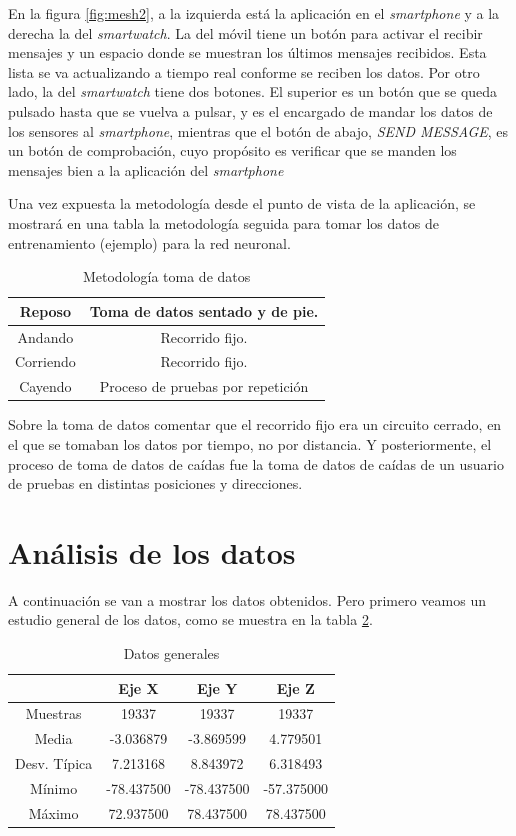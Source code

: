 \documentclass[12pt]{book}
\numberwithin{equation}{section}
\begin{document}
En la figura \ref{fig:mesh2}, a la izquierda está la aplicación en el \textit{smartphone} y a la derecha la del \textit{smartwatch}. La del móvil tiene un botón para activar el recibir mensajes y un espacio donde se muestran los últimos mensajes recibidos. Esta lista se va actualizando a tiempo real conforme se reciben los datos. Por otro lado, la del \textit{smartwatch} tiene dos botones. El superior es un botón que se queda pulsado hasta que se vuelva a pulsar, y es el encargado de mandar los datos de los sensores al \textit{smartphone}, mientras que el botón de abajo, \textit{SEND MESSAGE}, es un botón de comprobación, cuyo propósito es verificar que se manden los mensajes bien a la aplicación del \textit{smartphone}

Una vez expuesta la metodología desde el punto de vista de la aplicación, se mostrará en una tabla la metodología seguida para tomar los datos de entrenamiento (ejemplo) para la red neuronal.

\begin{table}
\centering
\caption{Metodología toma de datos}
\begin{tabular}{| c | c |}
\hline
Reposo & Toma de datos sentado y de pie. \\
\hline
Andando & Recorrido fijo. \\
\hline
Corriendo & Recorrido fijo. \\
\hline
Cayendo & Proceso de pruebas por repetición \\
\hline
\end{tabular}
\label{tabla1}
\end{table}

Sobre la toma de datos comentar que el recorrido fijo era un circuito cerrado, en el que se tomaban los datos por tiempo, no por distancia. Y posteriormente, el proceso de toma de datos de caídas fue la toma de datos de caídas de un usuario de pruebas en distintas posiciones y direcciones.

\section{Análisis de los datos}

A continuación se van a mostrar los datos obtenidos. Pero primero veamos un estudio general de los datos, como se muestra en la tabla \ref{tabla2}.
\begin{table}
\centering
\caption{Datos generales}
\begin{tabular}{| c | c | c | c |}
\hline
 & Eje X & Eje Y & Eje Z \\
\hline
Muestras & 19337 & 19337 & 19337 \\
\hline
Media & -3.036879 & -3.869599 & 4.779501 \\
\hline
Desv. Típica & 7.213168 & 8.843972 & 6.318493 \\
\hline
Mínimo & -78.437500 & -78.437500 & -57.375000 \\
\hline
Máximo & 72.937500 & 78.437500 & 78.437500 \\
\hline
\end{tabular}
\label{tabla2}
\end{table}
\end{document}
